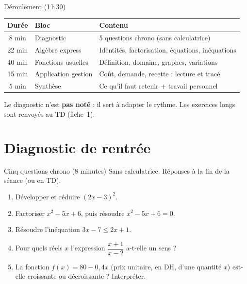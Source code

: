 \documentclass[10pt,aspectratio=169]{beamer}
\numberwithin{dummy}{section}
\begin{document}
\begin{frame}{Déroulement (1\,h\,30)}
\renewcommand{\arraystretch}{1.35}
\begin{center}
\begin{tabular}{@{}clp{7.6cm}@{}}
\toprule
\textbf{Durée} & \textbf{Bloc} & \textbf{Contenu} \\
\midrule
8 min  & Diagnostic & 5 questions chrono (sans calculatrice) \\
22 min & Algèbre express & Identités, factorisation, équations, inéquations \\
40 min & Fonctions usuelles & Définition, domaine, graphes, variations \\
15 min & Application gestion & Coût, demande, recette : lecture et tracé \\
5 min  & Synthèse & Ce qu'il faut retenir + travail personnel \\
\bottomrule
\end{tabular}
\end{center}
\vspace{0.5em}
\begin{boxattention}[Rythme]
Le diagnostic n'est \textbf{pas noté} : il sert à adapter le rythme.
Les exercices longs sont renvoyés au TD (fiche~1).
\end{boxattention}
\end{frame}


\section{Diagnostic de rentrée}

\begin{frame}{Cinq questions chrono (8 minutes)}
{\small Sans calculatrice. Réponses à la fin de la séance (ou en TD).}

\vspace{0.3em}
\begin{enumerate}\setlength{\itemsep}{0.55em}
    \item Développer et réduire $(2x-3)^2$.
    \item Factoriser $x^2-5x+6$, puis résoudre $x^2-5x+6=0$.
    \item Résoudre l'inéquation $3x-7\leqslant 2x+1$.
    \item Pour quels réels $x$ l'expression $\dfrac{x+1}{x-2}$ a-t-elle un sens ?
    \item La fonction $f(x)=80-0{,}4x$ (prix unitaire, en DH, d'une quantité $x$) est-elle croissante ou décroissante ? Interpréter.
\end{enumerate}
\end{frame}
\end{document}
